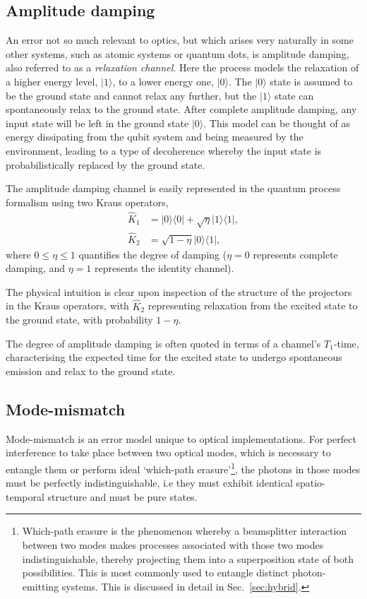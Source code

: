 \documentclass[aps,rmp,twocolumn,amsmath,amssymb,nofootinbib,superscriptaddress,longbibliography,floatfix,table-of-contents,eqsecnum]{revtex4-1}
\newcommand{\bra}[1]{\langle#1|}
\newcommand{\ket}[1]{|#1\rangle}
\begin{document}
\subsection{Amplitude damping}  \label{sec:amp_damp}

An error not so much relevant to optics, but which arises very naturally in some other systems, such as atomic systems or quantum dots, is amplitude damping, also referred to as a \textit{relaxation channel}. Here the process models the relaxation of a higher energy level, $\ket{1}$, to a lower energy one, $\ket{0}$. The $\ket{0}$ state is assumed to be the ground state and cannot relax any further, but the $\ket{1}$ state can spontaneously relax to the ground state. After complete amplitude damping, any input state will be left in the ground state $\ket{0}$. This model can be thought of as energy dissipating from the qubit system and being measured by the environment, leading to a type of decoherence whereby the input state is probabilistically replaced by the ground state.

The amplitude damping channel is easily represented in the quantum process formalism using two Kraus operators,
\begin{align}
\hat{K}_1 &= \ket{0}\bra{0} + \sqrt\eta\ket{1}\bra{1}, \nonumber \\
\hat{K}_2 &= \sqrt{1-\eta}\ket{0}\bra{1}, 
\end{align}
where \mbox{$0\leq\eta\leq 1$} quantifies the degree of damping (\mbox{$\eta=0$} represents complete damping, and \mbox{$\eta=1$} represents the identity channel).

The physical intuition is clear upon inspection of the structure of the projectors in the Kraus operators, with $\hat{K}_2$ representing relaxation from the excited state to the ground state, with probability \mbox{$1-\eta$}.

The degree of amplitude damping is often quoted in terms of a channel's $T_1$-time, characterising the expected time for the excited state to undergo spontaneous emission and relax to the ground state.

%
%

\subsection{Mode-mismatch} \label{sec:MM_error} 

Mode-mismatch is an error model unique to optical implementations. For perfect interference to take place between two optical modes, which is necessary to entangle them or perform ideal `which-path erasure'\footnote{Which-path erasure is the phenomenon whereby a beamsplitter interaction between two modes makes processes associated with those two modes indistinguishable, thereby projecting them into a superposition state of both possibilities. This is most commonly used to entangle distinct photon-emitting systems. This is discussed in detail in Sec.~\ref{sec:hybrid}.}, the photons in those modes must be perfectly indistinguishable, i.e they must exhibit identical spatio-temporal structure \cite{bib:RohdeMauererSilberhorn07} and must be pure states.
\end{document}
